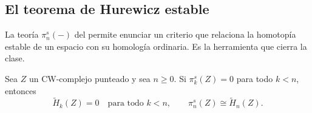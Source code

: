 \subsection{El teorema de Hurewicz estable}

La teoría $\pi_n^s(-)$ del  permite enunciar un criterio que relaciona la homotopía estable de un espacio con su homología ordinaria. Es la herramienta que cierra la clase.

\begin{teo}\label{teo:hurewicz}
Sea $Z$ un CW-complejo punteado y sea $n\ge0$. Si $\pi_k^s(Z)=0$ para todo $k<n$, entonces
\[
\tilde H_k(Z)=0\quad\text{para todo }k<n,
\qquad
\pi_n^s(Z)\cong\tilde H_n(Z).
\]
\end{teo}

